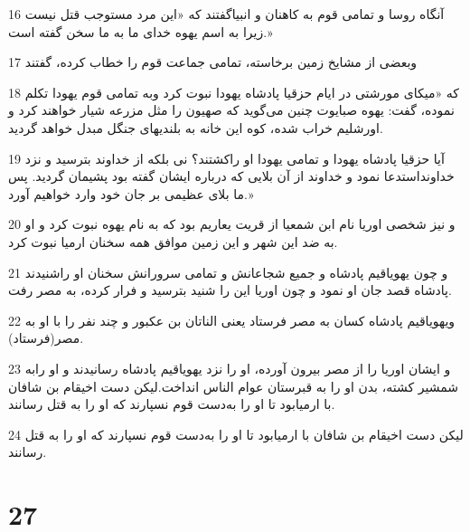\par 16 آنگاه روسا و تمامی قوم به کاهنان و انبیاگفتند که «این مرد مستوجب قتل نیست زیرا به اسم یهوه خدای ما به ما سخن گفته است.»
\par 17 وبعضی از مشایخ زمین برخاسته، تمامی جماعت قوم را خطاب کرده، گفتند 
\par 18 که «میکای مورشتی در ایام حزقیا پادشاه یهودا نبوت کرد وبه تمامی قوم یهودا تکلم نموده، گفت: یهوه صبایوت چنین می‌گوید که صهیون را مثل مزرعه شیار خواهند کرد و اورشلیم خراب شده، کوه این خانه به بلندیهای جنگل مبدل خواهد گردید.
\par 19 آیا حزقیا پادشاه یهودا و تمامی یهودا او راکشتند؟ نی بلکه از خداوند بترسید و نزد خداونداستدعا نمود و خداوند از آن بلایی که درباره ایشان گفته بود پشیمان گردید. پس ما بلای عظیمی بر جان خود وارد خواهیم آورد.»
\par 20 و نیز شخصی اوریا نام ابن شمعیا از قریت یعاریم بود که به نام یهوه نبوت کرد و او به ضد این شهر و این زمین موافق همه سخنان ارمیا نبوت کرد.
\par 21 و چون یهویاقیم پادشاه و جمیع شجاعانش و تمامی سرورانش سخنان او راشنیدند پادشاه قصد جان او نمود و چون اوریا این را شنید بترسید و فرار کرده، به مصر رفت.
\par 22 ویهویاقیم پادشاه کسان به مصر فرستاد یعنی الناتان بن عکبور و چند نفر را با او به مصر(فرستاد).
\par 23 و ایشان اوریا را از مصر بیرون آورده، او را نزد یهویاقیم پادشاه رسانیدند و او رابه شمشیر کشته، بدن او را به قبرستان عوام الناس انداخت.لیکن دست اخیقام بن شافان با ارمیابود تا او را به‌دست قوم نسپارند که او را به قتل رسانند.
\par 24 لیکن دست اخیقام بن شافان با ارمیابود تا او را به‌دست قوم نسپارند که او را به قتل رسانند.
 
\chapter{27}

